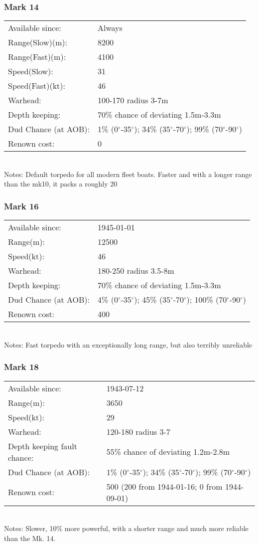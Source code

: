 \documentclass{article}
\newcommand{\degree}{$^{\circ}$}
\begin{document}
\subsubsection{Mark 14}
\begin{tabular}{l|l}
Available since:& Always\\
Range(Slow)(m):& 8200\\
Range(Fast)(m):& 4100\\
Speed(Slow):&31\\
Speed(Fast)(kt):& 46\\
Warhead:& 100-170 radius 3-7m\\
Depth keeping:& 70\% chance of deviating 1.5m-3.3m\\
Dud Chance (at AOB):& 1\% (0\degree-35\degree); 34\% (35\degree-70\degree); 99\% (70\degree-90\degree)\\
Renown cost:& 0\\
\end{tabular} \\
Notes: Default torpedo for all modern fleet boats. Faster and with a longer range than the mk10, it packs a roughly 20%

\subsubsection{Mark 16}
\begin{tabular}{l|l}
Available since:& 1945-01-01\\
Range(m):& 12500\\
Speed(kt):&46\\
Warhead:& 180-250 radius 3.5-8m\\
Depth keeping:&  70\% chance of deviating 1.5m-3.3m\\
Dud Chance (at AOB):& 4\% (0\degree-35\degree); 45\% (35\degree-70\degree); 100\% (70\degree-90\degree)\\
Renown cost:& 400\\
\end{tabular} \\
Notes: Fast torpedo with an exceptionally long range, but also terribly unreliable

\subsubsection{Mark 18}
\begin{tabular}{l|l}
Available since:& 1943-07-12\\
Range(m):& 3650\\
Speed(kt):&29\\
Warhead:& 120-180 radius 3-7\\
Depth keeping fault chance:& 55\% chance of deviating 1.2m-2.8m\\
Dud Chance (at AOB):& 1\% (0\degree-35\degree); 34\% (35\degree-70\degree); 99\% (70\degree-90\degree)\\
Renown cost:&  500 (200 from 1944-01-16; 0 from 1944-09-01)\\
\end{tabular} \\
Notes: Slower, 10\% more powerful, with a shorter range and much more reliable than the Mk. 14.
\end{document}
